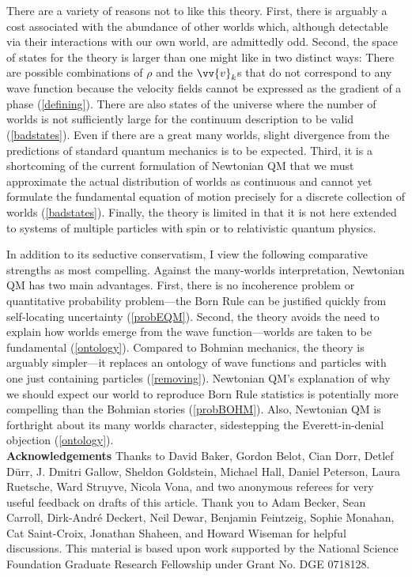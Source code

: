 \documentclass[12pt,secnumarabic,balancelastpage,amsmath,amssymb,nofootinbib]{article}
\begin{document}
There are a variety of reasons not to like this theory.  First, there is arguably a cost associated with the abundance of other worlds which, although detectable via their interactions with our own world, are admittedly odd.  Second, the space of states for the theory is larger than one might like in two distinct ways:  There are possible combinations of $\rho$ and the $\vv{v}_k$s that do not correspond to any wave function because the velocity fields cannot be expressed as the gradient of a phase (\textsection \ref{defining}).  There are also states of the universe where the number of worlds is not sufficiently large for the continuum description to be valid (\textsection \ref{badstates}).  Even if there are a great many worlds, slight divergence from the predictions of standard quantum mechanics is to be expected.  Third, it is a shortcoming of the current formulation of Newtonian QM that we must approximate the actual distribution of worlds as continuous and cannot yet formulate the fundamental equation of motion precisely for a discrete collection of worlds (\textsection \ref{badstates}).  Finally, the theory is limited in that it is not here extended to systems of multiple particles with spin or to relativistic quantum physics.

In addition to its seductive conservatism, I view the following comparative strengths as most compelling.  Against the many-worlds interpretation, Newtonian QM has two main advantages.  First, there is no incoherence problem or quantitative probability problem---the Born Rule can be justified quickly from self-locating uncertainty (\textsection \ref{probEQM}).  Second, the theory avoids the need to explain how worlds emerge from the wave function---worlds are taken to be fundamental (\textsection \ref{ontology}).  Compared to Bohmian mechanics, the theory is arguably simpler---it replaces an ontology of wave functions and particles with one just containing particles (\textsection \ref{removing}).  Newtonian QM's explanation of why we should expect our world to reproduce Born Rule statistics is potentially more compelling than the Bohmian stories (\textsection \ref{probBOHM}).  Also, Newtonian QM is forthright about its many worlds character, sidestepping the Everett-in-denial objection (\textsection \ref{ontology}).\\

\textbf{Acknowledgements}
Thanks to David Baker, Gordon Belot, Cian Dorr, Detlef D\"{u}rr, J. Dmitri Gallow, Sheldon Goldstein, Michael Hall, Daniel Peterson, Laura Ruetsche, Ward Struyve, Nicola Vona, and two anonymous referees for very useful feedback on drafts of this article.  Thank you to Adam Becker, Sean Carroll, Dirk-Andr\'{e} Deckert, Neil Dewar, Benjamin Feintzeig, Sophie Monahan, Cat Saint-Croix, Jonathan Shaheen, and Howard Wiseman for helpful discussions.  This material is based upon work supported by the National Science Foundation Graduate Research Fellowship under Grant No. DGE 0718128.


\end{document}
